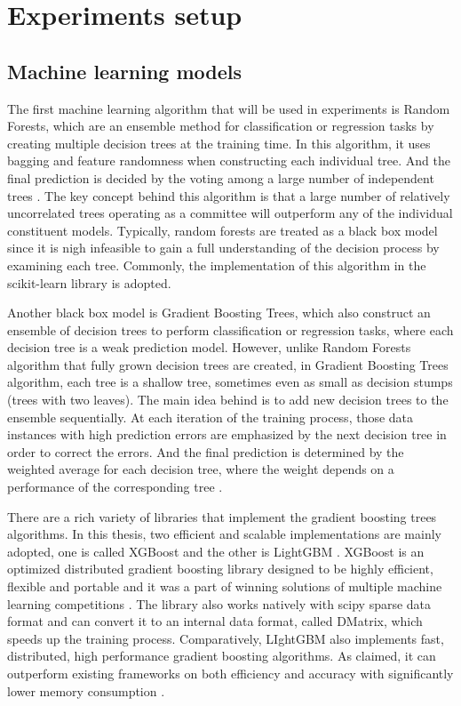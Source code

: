 \section{Experiments setup}


\subsection{Machine learning models}

The first machine learning algorithm that will be used in experiments is Random Forests, which are an ensemble method for classification or regression tasks by creating multiple decision trees at the training time. In this algorithm, it uses bagging and feature randomness when constructing each individual tree. And the final prediction is decided by the voting among a large number of independent trees \cite{breiman2001random}. The key concept behind this algorithm is that a large number of relatively uncorrelated trees operating as a committee will outperform any of the individual constituent models. Typically, random forests are treated as a black box model since it is nigh infeasible to gain a full understanding of the decision process by examining each tree. Commonly, the implementation of this algorithm in the scikit-learn library is adopted. 

Another black box model is Gradient Boosting Trees, which also construct an ensemble of decision trees to perform classification or regression tasks, where each decision tree is a weak prediction model. However, unlike Random Forests algorithm that fully grown decision trees are created, in Gradient Boosting Trees algorithm, each tree is a shallow tree, sometimes even as small as decision stumps (trees with two leaves). The main idea behind is to add new decision trees to the ensemble sequentially. At each iteration of the training process, those data instances with high prediction errors are emphasized by the next decision tree in order to correct the errors. And the final prediction is determined by the weighted average for each decision tree, where the weight depends on a performance of the corresponding tree \cite{natekin2013gradient}. 

There are a rich variety of libraries that implement the gradient boosting trees algorithms. In this thesis, two efficient and scalable implementations are mainly adopted, one is called XGBoost \cite{chen2016xgboost} and the other is LightGBM \cite{ke2017lightgbm}. XGBoost is an optimized distributed gradient boosting library designed to be highly efficient, flexible and portable and it was a part of winning solutions of multiple machine learning competitions \cite{xgboost}. The library also works natively with scipy sparse data format and can convert it to an internal data format, called DMatrix, which speeds up the training process. Comparatively, LIghtGBM also implements fast, distributed, high performance gradient boosting algorithms. As claimed, it can outperform existing frameworks on both efficiency and accuracy with significantly lower memory consumption \cite{lightgbm}. 



